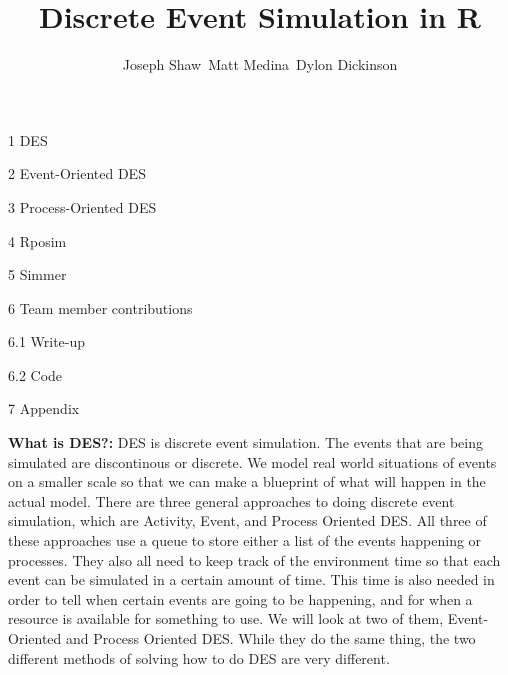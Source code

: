 \documentclass[titlepage]{article}
\author{\Large \newline Joseph Shaw\, Matt Medina\, Dylon Dickinson}
\title{\Huge Discrete Event Simulation in R}
\begin{document}
	\maketitle
	
\clearpage


\vspace{-1in}


\tableofcontents

\Large

1 \hspace{0.1in} DES

2 \hspace{0.1in} Event-Oriented DES

3 \hspace{0.1in} Process-Oriented DES

4 \hspace{0.1in} Rposim

5 \hspace{0.1in} Simmer

6 \hspace{0.1in} Team member contributions

\hspace{0.25in} 6.1 \hspace{0.1in} Write-up

\hspace{0.25in} 6.2 \hspace{0.1in} Code

7 \hspace{0.1in} Appendix

\clearpage




\Large \textbf{What is DES?:} \normalsize
DES is discrete event simulation. The events that are being simulated are discontinous or discrete. We model real world situations of events on a smaller scale so that we can make a blueprint of what will happen in the actual model. There are three general approaches to doing discrete event simulation, which are Activity, Event, and Process Oriented DES. All three of these approaches use a queue to store either a list of the events happening or processes. They also all need to keep track of the environment time so that each event can be simulated in a certain amount of time. This time is also needed in order to tell when certain events are going to be happening, and for when a resource is available for something to use. We will look at two of them, Event-Oriented and Process Oriented DES. While they do the same thing, the two different methods of solving how to do DES are very different.
\end{document}
